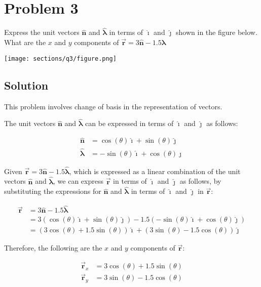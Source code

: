 \section*{Problem 3}

Express the unit vectors \( \mathbf{\hat{n}} \) and \( \mathbf{\hat{\lambda}} \) in terms of \( \mathbf{\hat{\imath}} \) and \( \mathbf{\hat{\jmath}} \) shown in the figure below.
What are the \( x \) and \( y \) components of \( \vec{\mathbf{r}} = 3\mathbf{\hat{n}} - 1.5\mathbf{\hat{\lambda}} \)

\begin{figure*}[h]
    \centering
    \texttt{[image: sections/q3/figure.png]}
\end{figure*}

\subsection*{Solution}

This problem involves change of basis in the representation of vectors.

The unit vectors \( \mathbf{\hat{n}} \) and \( \mathbf{\hat{\lambda}} \) can be expressed in terms of \( \mathbf{\hat{\imath}} \) and \( \mathbf{\hat{\jmath}} \) as follows:

\[
    \boxed{
        \begin{aligned}
            \mathbf{\hat{n}}       & = \cos(\theta) \mathbf{\hat{\imath}}  + \sin(\theta) \mathbf{\hat{\jmath}} \\
            \mathbf{\hat{\lambda}} & = -\sin(\theta) \mathbf{\hat{\imath}} + \cos(\theta) \mathbf{\hat{\jmath}}
        \end{aligned}
    }
\]

Given \( \vec{\mathbf{r}} = 3\mathbf{\hat{n}} - 1.5\mathbf{\hat{\lambda}} \), which is expressed as a linear combination of the unit vectors \( \mathbf{\hat{n}} \) and \( \mathbf{\hat{\lambda}} \), we can express \( \vec{\mathbf{r}} \) in terms of \( \mathbf{\hat{\imath}} \) and \( \mathbf{\hat{\jmath}} \) as follows, by substituting the expressions for \( \mathbf{\hat{n}} \) and \( \mathbf{\hat{\lambda}} \) in terms of \( \mathbf{\hat{\imath}} \) and \( \mathbf{\hat{\jmath}} \) in \( \vec{\mathbf{r}} \):

\[
    \begin{aligned}
        \vec{\mathbf{r}} & = 3\mathbf{\hat{n}} - 1.5\mathbf{\hat{\lambda}}                                                                                                              \\
                         & = 3(\cos(\theta) \mathbf{\hat{\imath}} + \sin(\theta) \mathbf{\hat{\jmath}}) - 1.5(-\sin(\theta) \mathbf{\hat{\imath}} + \cos(\theta) \mathbf{\hat{\jmath}}) \\
                         & = (3\cos(\theta) + 1.5\sin(\theta))\mathbf{\hat{\imath}} + (3\sin(\theta) - 1.5\cos(\theta))\mathbf{\hat{\jmath}}
    \end{aligned}
\]

Therefore, the following are the \( x \) and \( y \) components of \( \vec{\mathbf{r}} \):

\[
    \boxed{
        \begin{aligned}
            \vec{\mathbf{r}}_x & = 3\cos(\theta) + 1.5\sin(\theta) \\
            \vec{\mathbf{r}}_y & = 3\sin(\theta) - 1.5\cos(\theta)
        \end{aligned}
    }
\]
